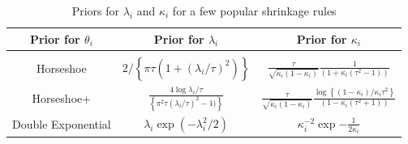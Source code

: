 \documentclass[11pt]{article}
\begin{document}
\begin{table}[!ht]
\centering
\caption{Priors for $\lambda_i$ and $\kappa_i$ for a few popular shrinkage rules}
\begin{tabular}{ccc}
\hline
Prior for $\theta_i$ & Prior for $\lambda_i$ & Prior for $\kappa_i$ \\ 
\hline \\
Horseshoe & $2/ \left\{ \pi \tau (1 + (\lambda_i/\tau)^2 )\right\}$  & $\frac{\tau}{\sqrt{\kappa_i (1-\kappa_i )}} \frac{1}{(1+\kappa_i (\tau^2 -1 ) )}$ \\[10pt]
Horseshoe+ & $\frac{4\log \lambda_i/\tau}{\left\{{\pi^2 \tau}(\lambda_i/\tau)^2 -1)\right\}}$ &  $\frac{\tau}{\sqrt{\kappa_i (1-\kappa_i )}}\frac{\log \left \{ ( 1 - \kappa_i ) / \kappa_i \tau^2 \right \}}{ (1-\kappa_i (\tau^2 +1 ))}$ \\[10pt]
Double Exponential & $\lambda_i \exp (-\lambda_i^2/2)$ & $\kappa_i^{-2} \exp{-\frac{1}{2\kappa_i}}$ \\
\hline 
\end{tabular}
\end{table}
\end{document}
